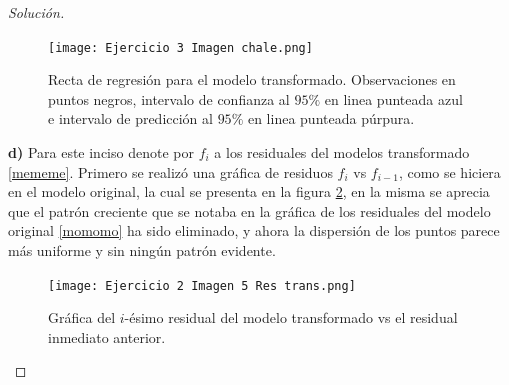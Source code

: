 \documentclass[10.5pt,notitlepage]{article}
\newenvironment{solucion}
  {\begin{proof}[Solución]}
  {\end{proof}}
\theoremstyle{plain}
\begin{document}
\begin{solucion}
\begin{figure}[htb]
 \centering
 \texttt{[image: Ejercicio 3 Imagen chale.png]}
 \caption{Recta de regresión para el modelo transformado. Observaciones en puntos negros, intervalo de confianza al \(95\%\) en linea punteada azul e intervalo de predicción al \(95\%\) en linea punteada púrpura.}
\label{fig:4.5}
\end{figure}

\noindent \textbf{d)}  Para este inciso denote por \(f_i\) a los residuales del modelos transformado \eqref{mememe}. Primero se realizó una gráfica de residuos \(f_i\) vs \(f_{i-1}\), como se hiciera en el modelo original, la cual se presenta en la figura \ref{fig:7}, en la misma se aprecia que el patrón creciente que se notaba en la gráfica de los residuales del modelo original \eqref{momomo} ha sido eliminado, y ahora la dispersión de los puntos parece más uniforme y sin ningún patrón evidente. \\
\begin{figure}[htb]
 \centering
 \texttt{[image: Ejercicio 2 Imagen 5 Res trans.png]}
 \caption{Gráfica del \(i\)-ésimo residual del modelo transformado vs el residual inmediato anterior.}
\label{fig:7}
\end{figure}


\end{solucion}
\end{document}

